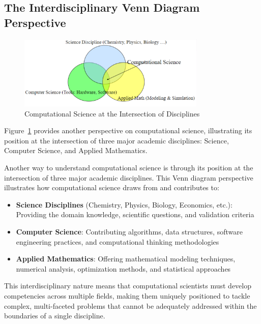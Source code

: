\subsection{The Interdisciplinary Venn Diagram Perspective}

\begin{figure}[h]
 \centering
 \includegraphics[width=0.8\textwidth]{images/computational_science_venn.png}
 \caption{Computational Science at the Intersection of Disciplines}
 \label{fig:computational_science_venn}
\end{figure}

Figure~\ref{fig:computational_science_venn} provides another perspective on computational science, illustrating its position at the intersection of three major academic disciplines: Science, Computer Science, and Applied Mathematics.

Another way to understand computational science is through its position at the intersection of three major academic disciplines. This Venn diagram perspective illustrates how computational science draws from and contributes to:

\begin{itemize}
  \item \textbf{Science Disciplines} (Chemistry, Physics, Biology, Economics, etc.): Providing the domain knowledge, scientific questions, and validation criteria
  \item \textbf{Computer Science}: Contributing algorithms, data structures, software engineering practices, and computational thinking methodologies
  \item \textbf{Applied Mathematics}: Offering mathematical modeling techniques, numerical analysis, optimization methods, and statistical approaches
\end{itemize}

This interdisciplinary nature means that computational scientists must develop competencies across multiple fields, making them uniquely positioned to tackle complex, multi-faceted problems that cannot be adequately addressed within the boundaries of a single discipline.

